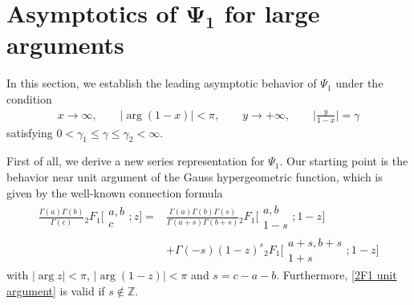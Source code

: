 \documentclass[pdftex]{sigma}
\numberwithin{equation}{section}
\newcommand{\ZZ}{\ensuremath{\mathbb{Z}}}
\begin{document}
\section[Asymptotics of Psi\_1 for large arguments]{Asymptotics of $\boldsymbol{\Psi_1}$ for large arguments}\label{Sect. 3}
In this section, we establish the leading asymptotic behavior of $\Psi_1$ under the condition
\begin{gather}\label{Psi_1 asymptotic condition}
	x\to \infty,\qquad |{\arg}(1-x)|<\pi,\qquad y\to +\infty,\qquad \biggl|\frac{y}{1-x}\biggr|=\gamma
\end{gather}
satisfying $0<\gamma_1\leqslant \gamma\leqslant \gamma_2<\infty$.

First of all, we derive a new series representation for $\Psi_1$. Our starting point is the behavior near unit argument of the Gauss hypergeometric function, which is given by the well-known connection formula \cite[equation~(1.2)]{Buhring-1987}
\begin{align}
		\frac{\Gamma(a)\Gamma(b)}{\Gamma(c)}{}_2F_1\biggl[\begin{matrix}
			a,b \\
			c
		\end{matrix};z\biggr]= {}& \frac{\Gamma(a)\Gamma(b)\Gamma(s)}{\Gamma(a+s)\Gamma(b+s)}
		{}_2F_1\biggl[\begin{matrix}
			a,b \\
			1-s
		\end{matrix};1-z\biggr]\nonumber\\
		 & +\Gamma(-s)(1-z)^s
		{}_2F_1\biggl[\begin{matrix}
			a+s,b+s \\
			1+s
		\end{matrix};1-z\biggr]\label{2F1 unit argument}
\end{align}
with $|\arg z|<\pi$, $|{\arg}(1-z)|<\pi$ and $s=c-a-b$. Furthermore, \eqref{2F1 unit argument} is valid if $s\notin\ZZ$.
\end{document}
